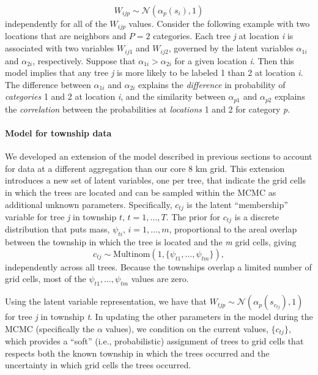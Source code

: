 \documentclass[10pt,letterpaper]{article}
\newcommand{\N}{\mathcal{N}}
\begin{document}
\noindent 
\[
W_{ijp}\sim\N(\alpha_{p}(s_{i}),1)
\]
independently for all of the $W_{ijp}$ values. Consider the following
example with two locations that are neighbors and $P=2$ categories.
Each tree \emph{j} at location \emph{i} is associated with two variables $W_{ij1}$
and $W_{ij2}$, governed by the latent variables $\alpha_{1i}$ and
$\alpha_{2i}$, respectively. Suppose that $\alpha_{1i}>\alpha_{2i}$
for a given location \emph{i}. Then this model implies that any tree \emph{j}
is more likely to be labeled 1 than 2 at location \emph{i}. The difference
between $\alpha_{1i}$ and $\alpha_{2i}$ explains the \textit{difference}
in probability of \textit{categories} 1 and 2 at location \emph{i}, and
the similarity between $\alpha_{p1}$ and $\alpha_{p2}$ explains
the \textit{correlation} between the probabilities at \textit{locations}
1 and 2 for category \emph{p}.



\paragraph*{Model for township data}
\label{sub:Model-for-township}

\linenumbers

We developed an extension of the model described in previous sections
to account for data at a different aggregation than our core 8 km
grid. This extension introduces a new set of latent variables, one
per tree, that indicate the grid cells in which the trees are located
and can be sampled within the MCMC as additional unknown parameters.
Specifically, $c_{tj}$ is the latent ``membership'' variable for
tree \emph{j} in township $t$, $t=1,\ldots,T$. The prior for $c_{tj}$
is a discrete distribution that puts mass, $\psi_{ti}$, $i=1,\ldots,m$,
proportional to the areal overlap between the township in which the
tree is located and the \emph{m} grid cells, giving 
\[
c_{tj}\sim\mbox{Multinom}(1,\{\psi_{t1},\ldots,\psi_{tm}\}),
\]
independently across all trees. Because the townships overlap a limited
number of grid cells, most of the $\psi_{t1},\ldots,\psi_{tm}$ values
are zero.

Using the latent variable representation, we have that $W_{tjp}\sim\N(\alpha_{p}(s_{c_{tj}}),1)$
for tree \emph{j} in township \emph{t}. In updating the other parameters in
the model during the MCMC (specifically the $\alpha$ values), we
condition on the current values, $\{c_{tj}\}$, which provides a ``soft''
(i.e., probabilistic) assignment of trees to grid cells that respects
both the known township in which the trees occurred and the uncertainty
in which grid cells the trees occurred.
\end{document}
